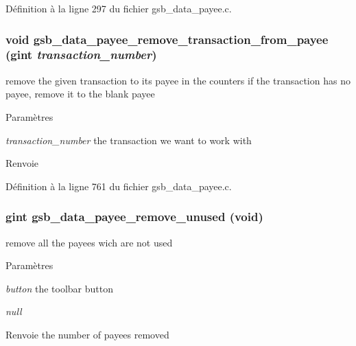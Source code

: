Définition à la ligne 297 du fichier gsb\_\-data\_\-payee.c.

\subsubsection[{gsb\_\-data\_\-payee\_\-remove\_\-transaction\_\-from\_\-payee}]{\setlength{\rightskip}{0pt plus 5cm}void gsb\_\-data\_\-payee\_\-remove\_\-transaction\_\-from\_\-payee (gint {\em transaction\_\-number})}\label{gsb__data__payee_8c_afeef17c3b690983a07a2f373e5de6b55}
remove the given transaction to its payee in the counters if the transaction has no payee, remove it to the blank payee


\begin{DoxyParams}{Paramètres}
\item[{\em transaction\_\-number}]the transaction we want to work with\end{DoxyParams}
\begin{DoxyReturn}{Renvoie}

\end{DoxyReturn}


Définition à la ligne 761 du fichier gsb\_\-data\_\-payee.c.

\subsubsection[{gsb\_\-data\_\-payee\_\-remove\_\-unused}]{\setlength{\rightskip}{0pt plus 5cm}gint gsb\_\-data\_\-payee\_\-remove\_\-unused (void)}\label{gsb__data__payee_8c_ac57729c4bcccf5d7a6eb06da6a87a8f1}
remove all the payees wich are not used


\begin{DoxyParams}{Paramètres}
\item[{\em button}]the toolbar button \item[{\em null}]\end{DoxyParams}
\begin{DoxyReturn}{Renvoie}
the number of payees removed 
\end{DoxyReturn}



